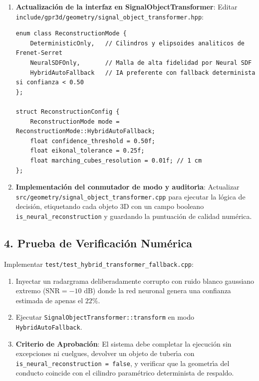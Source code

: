 \documentclass[11pt,a4paper]{article}
\begin{document}
\begin{enumerate}
    \item \textbf{Actualizaci{\'o}n de la interfaz en SignalObjectTransformer}:
    Editar \texttt{include/gpr3d/geometry/signal\_object\_transformer.hpp}:
\begin{verbatim}
enum class ReconstructionMode {
    DeterministicOnly,   // Cilindros y elipsoides analiticos de Frenet-Serret
    NeuralSDFOnly,       // Malla de alta fidelidad por Neural SDF
    HybridAutoFallback   // IA preferente con fallback determinista si confianza < 0.50
};

struct ReconstructionConfig {
    ReconstructionMode mode = ReconstructionMode::HybridAutoFallback;
    float confidence_threshold = 0.50f;
    float eikonal_tolerance = 0.25f;
    float marching_cubes_resolution = 0.01f; // 1 cm
};
\end{verbatim}

    \item \textbf{Implementaci{\'o}n del conmutador de modo y auditor{\'\i}a}:
    Actualizar \texttt{src/geometry/signal\_object\_transformer.cpp} para ejecutar la l{\'o}gica de decisi{\'o}n, etiquetando cada objeto 3D con un campo booleano \texttt{is\_neural\_reconstruction} y guardando la puntuaci{\'o}n de calidad num{\'e}rica.
\end{enumerate}

\subsection{4. Prueba de Verificaci{\'o}n Num{\'e}rica}
Implementar \texttt{test/test\_hybrid\_transformer\_fallback.cpp}:
\begin{enumerate}
    \item Inyectar un radargrama deliberadamente corrupto con ruido blanco gaussiano extremo ($\text{SNR} = -10\text{ dB}$) donde la red neuronal genera una confianza estimada de apenas el $22\%$.
    \item Ejecutar \texttt{SignalObjectTransformer::transform} en modo \texttt{HybridAutoFallback}.
    \item \textbf{Criterio de Aprobaci{\'o}n}: El sistema debe completar la ejecuci{\'o}n sin excepciones ni cuelgues, devolver un objeto de tuber{\'\i}a con \texttt{is\_neural\_reconstruction = false}, y verificar que la geometr{\'\i}a del conducto coincide con el cilindro param{\'e}trico determinista de respaldo.
\end{enumerate}

\newpage
\end{document}
